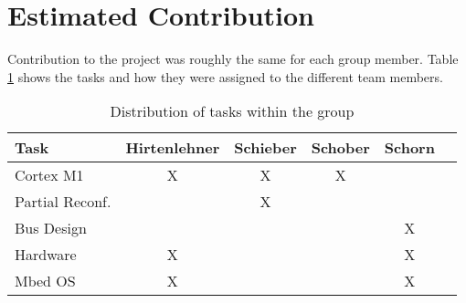 \section{Estimated Contribution}
Contribution to the project was roughly the same for each group member.
Table \ref{tbl:AssignedTasks} shows the tasks and how they were assigned to the different team members.
    \begin{table}
        \centering
\begin{tabular}{ l | c c c c c}
 Task & Hirtenlehner & Schieber & Schober & Schorn\\ 
 \hline
Cortex M1       & X & X & X &   \\
Partial Reconf. &   & X &   &   \\
Bus Design      &   &   &   & X \\
Hardware        & X &   &   & X \\
Mbed OS         & X &   &   & X \\
\end{tabular}
\caption{Distribution of tasks within the group}
\label{tbl:AssignedTasks}
\end{table}